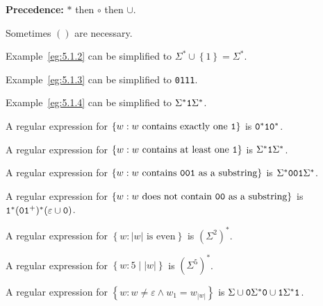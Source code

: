 \documentclass{notes}
\begin{document}
{\boldmath \bfseries Precedence:} $*$ then $\circ$ then $\cup$.

\begin{note}
  Sometimes $()$ are necessary.
\end{note}

\begin{eg}
  Example~\ref{eg:5.1.2} can be simplified to $\Sigma^* \cup \left \{ 1 \right \} = \Sigma^*$.
\end{eg}

\begin{eg}
  Example~\ref{eg:5.1.3} can be simplified to \verb~0111~.
\end{eg}

\begin{eg}
  Example~\ref{eg:5.1.4} can be simplified to $\Sigma^* \verb~1~ \Sigma^*$.
\end{eg}

\begin{eg}
  A regular expression for $\left \{ w : \text{$w$ contains exactly one \verb~1~} \right \}$ is $\verb~0~^* \verb~1~ \verb~0~^*$.
\end{eg}

\begin{eg}
  A regular expression for $\left \{ w : \text{$w$ contains at least one \verb~1~} \right \}$ is $\Sigma^* \verb~1~ \Sigma^*$.
\end{eg}

\begin{eg}
  A regular expression for $\left \{ w : \text{$w$ contains \verb~001~ as a substring} \right \}$ is $\Sigma^* \verb~001~ \Sigma^*$.
\end{eg}

\begin{eg}
  A regular expression for $\left \{ w : \text{$w$ does not contain \verb~00~ as a substring} \right \}$ is $\verb~1~^* (\verb~0~ \verb~1~^+)^* (\varepsilon \cup \verb~0~)$.
\end{eg}

\begin{eg}
  A regular expression for $\left \{ w : \text{$|w|$ is even} \right \}$ is $(\Sigma^2)^*$.
\end{eg}

\begin{eg}
  A regular expression for $\left \{ w : 5 \mid |w| \right \}$ is $(\Sigma^5)^*$.
\end{eg}

\begin{eg}
  A regular expression for $\left \{ w : w \neq \varepsilon \land w_1 = w_{|w|} \right \}$ is $\Sigma \cup \verb~0~ \Sigma^* \verb~0~ \cup \verb~1~ \Sigma^* \verb~1~$.
\end{eg}
\end{document}
